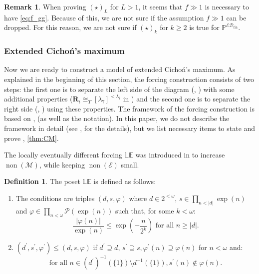 \documentclass[a4paper,12pt]{amsart}
\theoremstyle{definition}
\newtheorem{dfn}[thm]{Definition}
\newtheorem{rem}[thm]{Remark}
\numberwithin{thm}{section}
\numberwithin{equation}{section}
\newcommand{\sq}{2^{<\omega}}
\DeclareMathOperator{\non}{non}
\newcommand{\nonm}{\non(\mathcal{M})}
\newcommand{\R}{\mathbf{R}}
\newcommand{\lebb}{\mathbb{LE}}
\newcommand{\ind}{i}
\newcommand{\none}{\non(\mathcal{E})}
\newcommand{\edfin}{\mathcal{ED}_\mathrm{fin}}
\newcommand{\posetEDfin}{\mathbb{P}^{\edfin}}
\begin{document}
    \begin{rem}\label{rem:posetEDfin_UF_limits}
        When proving $(\star)_L$ for $L>1$, it seems that $f\gg 1$ is necessary to have \eqref{eq:f_gg}. Because of this, we are not sure if the assumption $f\gg 1$ can be dropped. 
        For this reason, we are not sure if $(\star)_k$ for $k\geq2$ is true for $\posetEDfin$.
    \end{rem}

    \subsubsection{Extended Cicho\'n's maximum}

    Now we are ready to construct a model of extended Cicho\'n's maximum. As explained in the beginning of this section, the forcing construction consists of two steps: the first one is to separate the left side of the diagram (, ) with some additional properties ($\R_\ind\cong_T [\lambda_7]^{<\lambda_\ind}$ in ) and the second one is to separate the right side (, ) using these properties. The framework of the forcing construction is based on \cite{Yam25}, \cite{Yam24} (as well as the notation). In this paper, we do not describe the framework in detail (see \cite{Yam25}, \cite{Yam24} for the details), but we list necessary items to state and prove , \ref{thm:CM}.

    The locally eventually different forcing $\lebb$ was introduced in \cite{Yam24} to increase $\nonm$, while keeping $\none$ small.
    
    \begin{dfn}
        The poset $\lebb$ is defined as follows:
		\begin{enumerate}
			\item The conditions are triples $(d,s,\varphi)$ where $d\in\sq$, $s\in\prod_{n<|d|} \exp(n)$ and $\varphi\in\prod_{n<\omega}\mathcal{P}(\exp(n))$ such that, for some $k<\omega$:
			\begin{equation*}
				\dfrac{|\varphi(n)|}{\exp(n)}\leq\exp\left(-\dfrac{n}{2^k}\right)\text{ for all }n\geq|d|.
			\end{equation*} 
			
            \item $(d^\prime,s^\prime,\varphi^\prime)\leq(d,s,\varphi)$ if $d^\prime\supseteq d$, $s^\prime\supseteq s, \varphi^\prime(n)\supseteq\varphi(n)$ for $n<\omega$ and:
			\begin{equation*}
		          \text{for all }n\in(d^\prime)^{-1}(\{1\})\setminus d^{-1}(\{1\}), s^\prime(n)\notin\varphi(n).
			\end{equation*}
		\end{enumerate}	
    \end{dfn}
\end{document}
